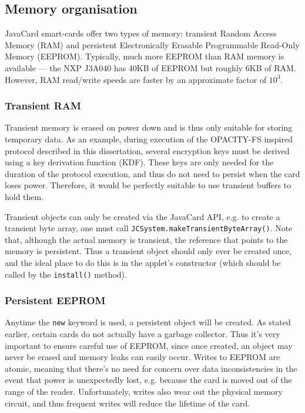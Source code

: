 \documentclass[12pt,a4paper,twoside,openright]{report}
\begin{document}
\subsection{Memory organisation} \label{javacardmemory}

JavaCard smart-cards offer two types of memory: transient Random Access Memory (RAM) and persistent Electronically Erasable Programmable Read-Only Memory (EEPROM). Typically, much more EEPROM than RAM memory is available --- the NXP J3A040 has 40KB of EEPROM but roughly 6KB of RAM. However, RAM read/write speeds are faster by an approximate factor of $10^3$.

\subsubsection{Transient RAM}

Transient memory is erased on power down and is thus only suitable for storing temporary data. As an example, during execution of the OPACITY-FS inspired protocol described in this dissertation, several encryption keys must be derived using a key derivation function (KDF). These keys are only needed for the duration of the protocol execution, and thus do not need to persist when the card loses power. Therefore, it would be perfectly suitable to use transient buffers to hold them.

Transient objects can only be created via the JavaCard API, e.g. to create a transient byte array, one must call \texttt{JCSystem.makeTransientByteArray()}. Note that, although the actual memory is transient, the reference that points to the memory is persistent. Thus a transient object should only ever be created once, and the ideal place to do this is in the applet's constructor (which should be called by the \texttt{install()} method).

\subsubsection{Persistent EEPROM}

Anytime the \texttt{new} keyword is used, a persistent object will be created. As stated earlier, certain cards do not actually have a garbage collector. Thus it's very important to ensure careful use of EEPROM, since once created, an object may never be erased and memory leaks can easily occur. Writes to EEPROM are atomic, meaning that there's no need for concern over data inconsistencies in the event that power is unexpectedly lost, e.g. because the card is moved out of the range of the reader. Unfortunately, writes also wear out the physical memory circuit, and thus frequent writes will reduce the lifetime of the card.
\end{document}
